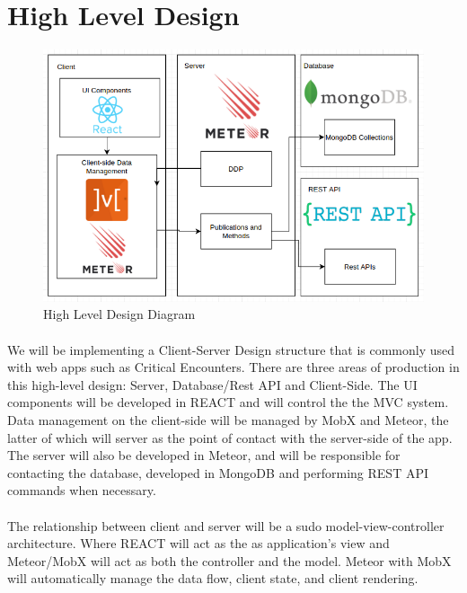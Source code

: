 \documentclass[12pt,a4paper]{report}
\begin{document}
	\section {High Level Design}
		\begin{figure}[h]
			\includegraphics[scale=.5]{designsd.png}
			\caption{High Level Design Diagram}
			\label{fig: High Level Design}
		\end{figure}
		
		\paragraph{}We will be implementing a Client-Server Design structure that is commonly used with web apps such as Critical Encounters. There are three areas of production in this high-level design: Server, Database/Rest API and Client-Side. The UI components will be developed in REACT and will control the the MVC system. Data management on the client-side will be managed by MobX and Meteor, the latter of which will server as the point of contact with the server-side of the app. The server will also be developed in Meteor, and will be responsible for contacting the database, developed in MongoDB and performing REST API commands when necessary. 
		
		\paragraph {} The relationship between client and server will be a sudo model-view-controller architecture. Where REACT will act as the as application's view and Meteor/MobX will act as both the controller and the model. Meteor with MobX will automatically manage the data flow, client state, and client rendering.
	
\end{document}
